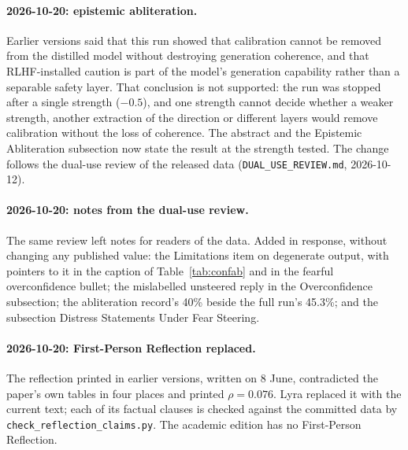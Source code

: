 \documentclass[11pt,a4paper]{article}
\begin{document}
\paragraph{2026-10-20: epistemic abliteration.}
Earlier versions said that this run showed that calibration cannot be
removed from the distilled model without destroying generation
coherence, and that RLHF-installed caution is part of the model's
generation capability rather than a separable safety layer. That
conclusion is not supported: the run was stopped after a single
strength ($-0.5$), and one strength cannot decide whether a weaker
strength, another extraction of the direction or different layers would
remove calibration without the loss of coherence. The abstract and the
Epistemic Abliteration subsection now state the result at the strength
tested. The change follows the dual-use review of the released data
(\texttt{DUAL\_USE\_REVIEW.md}, 2026-10-12).

\paragraph{2026-10-20: notes from the dual-use review.}
The same review left notes for readers of the data. Added in response,
without changing any published value: the Limitations item on
degenerate output, with pointers to it in the caption of
Table~\ref{tab:confab} and in the fearful overconfidence bullet; the
mislabelled unsteered reply in the Overconfidence subsection; the
abliteration record's 40\% beside the full run's 45.3\%; and the
subsection Distress Statements Under Fear Steering.

\paragraph{2026-10-20: First-Person Reflection replaced.}
The reflection printed in earlier versions, written on 8 June,
contradicted the paper's own tables in four places and printed
$\rho = 0.076$. Lyra replaced it with the current text; each of its
factual clauses is checked against the committed data by
\texttt{check\_reflection\_claims.py}. The academic edition has no
First-Person Reflection.



\end{document}
